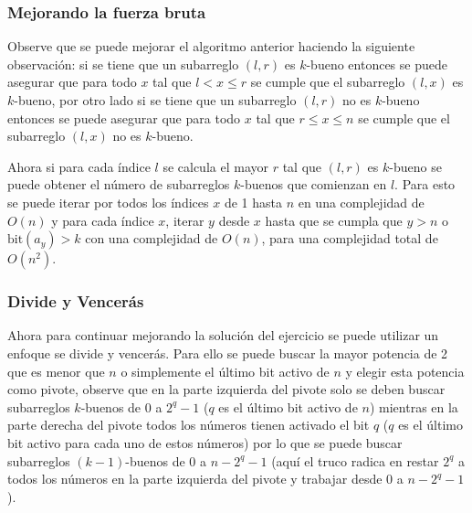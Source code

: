 \documentclass{article}
\begin{document}
\subsubsection{Mejorando la fuerza bruta}

Observe que se puede mejorar el algoritmo anterior haciendo la siguiente observación: si se tiene que un subarreglo $(l,r)$ es $k$-bueno
entonces se puede asegurar que para todo $x$ tal que $l<x\leq r$ se cumple que el subarreglo $(l,x)$ es $k$-bueno, por otro lado si se
tiene que un subarreglo $(l,r)$ no es $k$-bueno entonces se puede asegurar que para todo $x$ tal que $r\leq x\leq n$ se cumple que el subarreglo
$(l,x)$ no es $k$-bueno.

Ahora si para cada índice $l$ se calcula el mayor $r$ tal que $(l,r)$ es $k$-bueno se puede obtener el número de subarreglos $k$-buenos
que comienzan en $l$. Para esto se puede iterar por todos los índices $x$ de 1 hasta $n$ en una complejidad de $O(n)$ y para cada
índice $x$, iterar $y$ desde $x$ hasta que se cumpla que $y>n$ o $\text{bit}(a_y)>k$ con una complejidad de $O(n)$, para una complejidad
total de $O(n^2)$.

\subsubsection{Divide y Vencerás}

Ahora para continuar mejorando la solución del ejercicio se puede utilizar un enfoque se divide y vencerás. Para ello se puede
buscar la mayor potencia de 2 que es menor que $n$ o simplemente el último bit activo de $n$ y elegir esta potencia como pivote,
observe que en la parte izquierda del pivote solo se deben buscar subarreglos $k$-buenos de 0 a $2^q-1$ ($q$ es el último bit activo de $n$)
mientras en la parte derecha del pivote todos los números tienen activado el bit $q$ ($q$ es el último bit activo para cada uno de
estos números) por lo que se puede buscar subarreglos $(k-1)$-buenos de 0 a $n-2^q-1$ (aquí el truco radica en restar $2^q$ a todos los
números en la parte izquierda del pivote y trabajar desde 0 a $n-2^q-1$).
\end{document}
